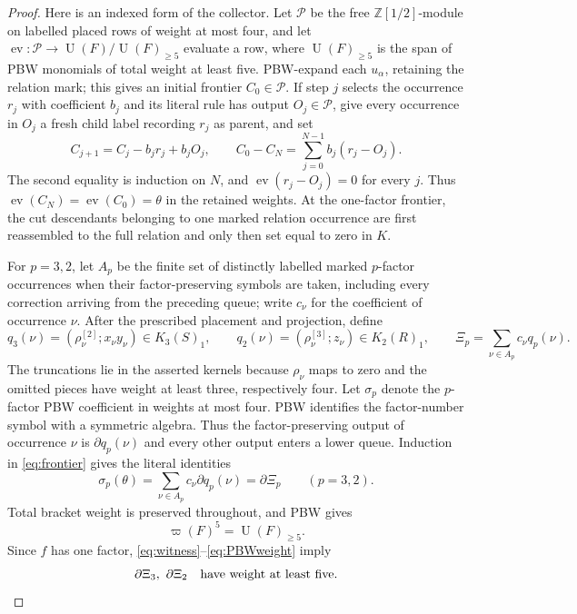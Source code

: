 \documentclass[10pt,a4paper]{amsart}
\theoremstyle{remark}
\newcommand{\R}{\mathbb Z[1/2]}
\newcommand{\U}{\operatorname U}
\newcommand{\aug}{\varpi}
\begin{document}
\begin{proof}
Here is an indexed form of the collector.  Let $\mathcal P$ be the
free $\R$-module on labelled placed rows of weight at most four, and
let $\operatorname{ev}:\mathcal P\to\U(F)/\U(F)_{\ge5}$ evaluate a
row, where $\U(F)_{\ge5}$ is the span of PBW monomials of total weight
at least five.  PBW-expand each $u_\alpha$, retaining the relation
mark; this gives an initial frontier $C_0\in\mathcal P$.  If step $j$ selects the occurrence
$r_j$ with coefficient $b_j$ and its literal rule has output
$O_j\in\mathcal P$, give every occurrence in $O_j$ a fresh child label
recording $r_j$ as parent, and set
\begin{equation}
 C_{j+1}=C_j-b_jr_j+b_jO_j,\qquad
 C_0-C_N=\sum_{j=0}^{N-1}b_j(r_j-O_j).                 \label{eq:frontier}
\end{equation}
The second equality is induction on $N$, and
$\operatorname{ev}(r_j-O_j)=0$ for every $j$.  Thus
$\operatorname{ev}(C_N)=\operatorname{ev}(C_0)=\theta$ in the retained
weights.  At the one-factor frontier, the cut descendants belonging to one
marked relation occurrence are first reassembled to the full relation
and only then set equal to zero in $K$.

For $p=3,2$, let $A_p$ be the finite set of distinctly labelled marked
$p$-factor occurrences when their factor-preserving symbols are taken,
including every correction arriving from the preceding queue; write
$c_\nu$ for the coefficient of occurrence $\nu$.  After the prescribed
placement and projection, define
\[
 q_3(\nu)=(\rho_\nu^{[2]};x_\nu y_\nu)\in K_3(S)_1,
 \qquad q_2(\nu)=(\rho_\nu^{[3]};z_\nu)\in K_2(R)_1,
 \qquad
 \Xi_p=\sum_{\nu\in A_p}c_\nu q_p(\nu).
\]
The truncations lie in the asserted kernels because $\rho_\nu$ maps to
zero and the omitted pieces have weight at least three, respectively
four.  Let $\sigma_p$ denote the $p$-factor PBW coefficient in weights
at most four.  PBW identifies the factor-number symbol with a symmetric
algebra.  Thus the factor-preserving output of occurrence $\nu$ is
$\partial q_p(\nu)$ and every other output enters a lower queue.
Induction in \eqref{eq:frontier} gives the literal identities
\begin{equation}
 \sigma_p(\theta)=\sum_{\nu\in A_p}c_\nu\partial q_p(\nu)
                 =\partial\Xi_p\qquad(p=3,2).           \label{eq:symbol}
\end{equation}
Total bracket weight is preserved throughout, and PBW gives
\begin{equation}
                         \aug(F)^5=\U(F)_{\ge5}.         \label{eq:PBWweight}
\end{equation}
Since $f$ has one factor,
\eqref{eq:witness}--\eqref{eq:PBWweight} imply
\begin{equation}
       \partial\Xi_3,\ \partial\Xi_2
       \quad\hbox{have weight at least five}.           \label{eq:cycles}
\end{equation}


\end{proof}
\end{document}
